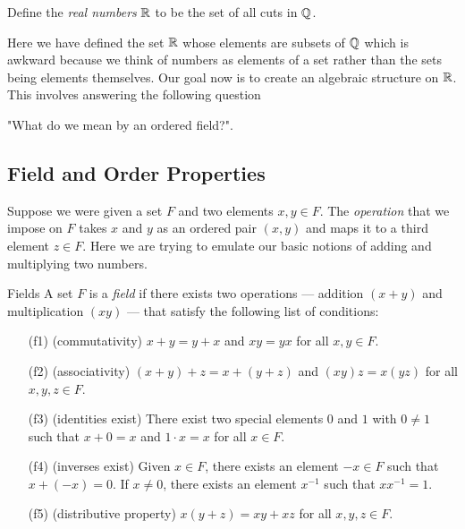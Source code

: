 \begin{definition}{}{}
    Define the \textit{real numbers} \( \mathbb{R}  \) to be the set of all cuts in \( \mathbb{Q}  \).
\end{definition}

Here we have defined the set \( \mathbb{R}  \) whose elements are subsets of \( \mathbb{Q}  \) which is awkward because we think of numbers as elements of a set rather than the sets being elements themselves. Our goal now is to create an algebraic structure on \( \mathbb{R}  \). This involves answering the following question
\begin{center}
    "What do we mean by an ordered field?".
\end{center}

\subsection{Field and Order Properties}

Suppose we were given a set \( F  \) and two elements \( x ,y \in F  \). The \textit{operation} that we impose on \( F  \) takes \( x  \) and \( y  \) as an ordered pair \( (x,y)  \) and maps it to a third element \( z \in F  \). Here we are trying to emulate our basic notions of adding and multiplying two numbers.

\begin{definition}{Fields}{}
   A set \( F  \) is a \textit{field} if there exists two operations --- addition \( (x+y)  \) and multiplication \( (xy) \) --- that satisfy the following list of conditions:
   \begin{enumerate}
       \item[(f1)] (commutativity) \( x + y = y + x  \) and \( xy = yx  \) for all \( x,y \in F  \).
       \item[(f2)] (associativity) \( (x+y) + z = x + (y+z)  \) and \( (xy)z = x(yz)    \) for all \( x,y,z \in F  \).
        \item[(f3)] (identities exist) There exist two special elements \( 0  \) and \( 1  \) with \(  0 \neq 1  \) such that \( x + 0 = x  \) and \( 1 \cdot x = x  \) for all \( x \in F  \).
        \item[(f4)] (inverses exist) Given \( x \in F  \), there exists an element \( -x \in F  \) such that \( x + (-x) = 0  \). If \( x \neq 0  \), there exists an element \( x^{-1} \) such that \(  x x^{-1} = 1  \).
        \item[(f5)] (distributive property) \( x(y+z) = xy + xz \) for all \( x,y,z \in F  \).
   \end{enumerate}
\end{definition}

